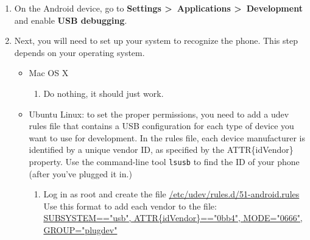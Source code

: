 \documentclass[10pt]{article}
\begin{document}
\begin{enumerate}
\item On the Android device, go to  \textbf{Settings \textgreater~Applications \textgreater~Development} and enable \textbf{USB debugging}.
\item Next, you will need to set up your system to recognize the phone. This step depends on your operating system. 
	\begin{itemize}
	\item Mac OS X
		\begin{enumerate}
		\item Do nothing, it should just work.
		\end{enumerate}
	\item Ubuntu Linux: to set the proper permissions, you need to add a udev rules file that contains a USB configuration for each type of device you want to use for development. In the rules file, each device manufacturer is identified by a unique vendor ID, as specified by the ATTR\{idVendor\} property. Use the command-line tool {\tt lsusb} to find the ID of your phone (after you've plugged it in.)
		\begin{enumerate}
		\item Log in as root and create the file \url{/etc/udev/rules.d/51-android.rules}\\
		
		Use this format to add each vendor to the file:\\
		\url{SUBSYSTEM=="usb", ATTR{idVendor}=="0bb4", MODE="0666", GROUP="plugdev"}\\
		

\end{enumerate}
\end{itemize}
\end{enumerate}
\end{document}

